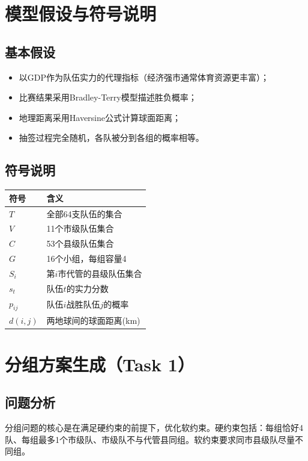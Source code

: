 \documentclass[a4paper,12pt]{article}
\begin{document}
\section{模型假设与符号说明}

\subsection{基本假设}
\begin{itemize}
    \item 以GDP作为队伍实力的代理指标（经济强市通常体育资源更丰富）；
    \item 比赛结果采用Bradley-Terry模型描述胜负概率；
    \item 地理距离采用Haversine公式计算球面距离；
    \item 抽签过程完全随机，各队被分到各组的概率相等。
\end{itemize}

\subsection{符号说明}
\begin{table}[H]
\centering
\begin{tabular}{ll}
\toprule
符号 & 含义 \\
\midrule
$T$ & 全部64支队伍的集合 \\
$V$ & 11个市级队伍集合 \\
$C$ & 53个县级队伍集合 \\
$G$ & 16个小组，每组容量4 \\
$S_i$ & 第$i$市代管的县级队伍集合 \\
$s_t$ & 队伍$t$的实力分数 \\
$p_{ij}$ & 队伍$i$战胜队伍$j$的概率 \\
$d(i,j)$ & 两地球间的球面距离(km) \\
\bottomrule
\end{tabular}
\end{table}

\section{分组方案生成（Task 1）}

\subsection{问题分析}
分组问题的核心是在满足硬约束的前提下，优化软约束。硬约束包括：每组恰好4队、每组最多1个市级队、市级队不与代管县同组。软约束要求同市县级队尽量不同组。
\end{document}
